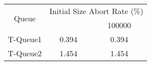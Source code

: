 \begin{tabular}{|c|c|c|}
\hline
\multirow{2}{*}{Queue} & \multicolumn{2}{c|}{Initial Size Abort Rate (\%)}\\\cline{2-3}& \quad 10000 \quad & 100000\\
\hline
\hline
T-Queue1 & 0.394 & 0.394\\
T-Queue2 & 1.454 & 1.454\\
\hline\end{tabular}

